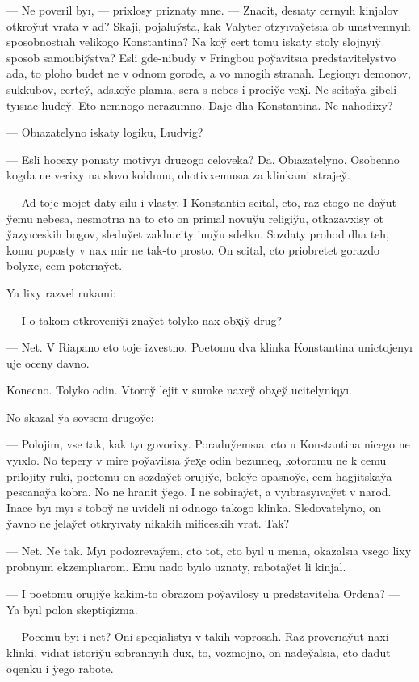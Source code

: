 \documentclass[10pt]{book}
\begin{document}
— Ne poveril byı, — prixlosy priznaty mne. — Znacit, desıaty cernyıh kinjalov otkroy̆ut vrata v ad? Skaji, pojaluy̆sta, kak Valyter otzyıvay̆etsıa ob umstvennyıh sposobnostıah velikogo Konstantina? Na koy̆ cert tomu iskaty stoly slojnyıy̆ sposob samoubiy̆stva? Esli gde-nibudy v Fringbou poy̆avitsıa predstavitelystvo ada, to ploho budet ne v odnom gorode, a vo mnogih stranah. Legionyı demonov, sukkubov, certey̆, adskoy̆e plamıa, sera s nebes i prociy̆e vex̨i. Ne scitay̆a gibeli tyısıac lıudey̆. Eto nemnogo nerazumno. Daje dlıa Konstantina. Ne nahodixy?

— Obıazatelyno iskaty logiku, Lıudvig?

— Esli hocexy ponıaty motivyı drugogo celoveka? Da. Obıazatelyno. Osobenno kogda ne verixy na slovo koldunu, ohotivxemusıa za klinkami strajey̆.

— Ad toje mojet daty silu i vlasty. I Konstantin scital, cto, raz etogo ne day̆ut y̆emu nebesa, nesmotrıa na to cto on prinıal novuy̆u religiy̆u, otkazavxisy ot y̆azyıceskih bogov, sleduy̆et zaklıucity inuy̆u sdelku. Sozdaty prohod dlıa teh, komu popasty v nax mir ne tak-to prosto. On scital, cto priobretet gorazdo bolyxe, cem poterıay̆et.

Ya lixy razvel rukami:

— I o takom otkroveniy̆i znay̆et tolyko nax obx̨iy̆ drug?

— Net. V Riapano eto toje izvestno. Poetomu dva klinka Konstantina unictojenyı uje oceny davno.

Konecno. Tolyko odin. Vtoroy̆ lejit v sumke naxey̆ obx̨ey̆ ucitelyniqyı.

No skazal y̆a sovsem drugoy̆e:

— Polojim, vse tak, kak tyı govorixy. Poraduy̆emsıa, cto u Konstantina nicego ne vyıxlo. No tepery v mire poy̆avilsıa y̆ex̨e odin bezumeq, kotoromu ne k cemu prilojity ruki, poetomu on sozday̆et orujiy̆e, boley̆e opasnoy̆e, cem hagjitskay̆a pescanay̆a kobra. No ne hranit y̆ego. I ne sobiray̆et, a vyıbrasyıvay̆et v narod. Inace byı myı s toboy̆ ne uvideli ni odnogo takogo klinka. Sledovatelyno, on y̆avno ne jelay̆et otkryıvaty nikakih mificeskih vrat. Tak?

— Net. Ne tak. Myı podozrevay̆em, cto tot, cto byıl u menıa, okazalsıa vsego lixy probnyım ekzemplıarom. Emu nado byılo uznaty, rabotay̆et li kinjal.

— I poetomu orujiy̆e kakim-to obrazom poy̆avilosy u predstavitelıa Ordena? — Ya byıl polon skeptiqizma.

— Pocemu byı i net? Oni speqialistyı v takih voprosah. Raz proverıay̆ut naxi klinki, vidıat istoriy̆u sobrannyıh dux, to, vozmojno, on nadey̆alsıa, cto dadut oqenku i y̆ego rabote.
\end{document}
